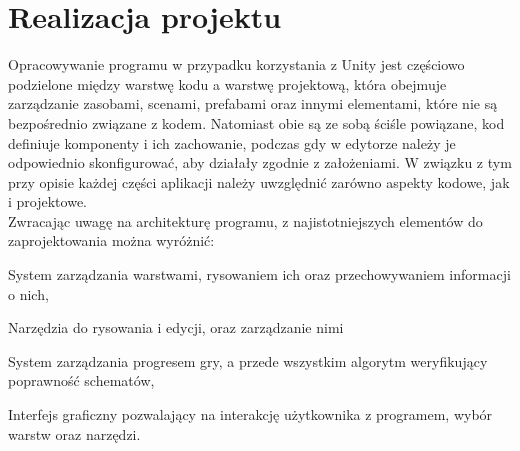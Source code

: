 \chapter{Realizacja projektu}
\label{ch:realizacja_projektu}

Opracowywanie programu w przypadku korzystania z Unity jest częściowo podzielone między warstwę kodu a warstwę projektową,
która obejmuje zarządzanie zasobami, scenami, prefabami oraz innymi elementami, które nie są bezpośrednio związane z kodem.
Natomiast obie są ze sobą ściśle powiązane, kod definiuje komponenty i ich zachowanie,
podczas gdy w edytorze należy je odpowiednio skonfigurować, aby działały zgodnie z założeniami.
W związku z tym przy opisie każdej części aplikacji należy uwzględnić zarówno aspekty kodowe, jak i projektowe.\\
\indent Zwracając uwagę na architekturę programu, z najistotniejszych elementów do zaprojektowania można wyróżnić:

\begin{citemize}
    \item System zarządzania warstwami, rysowaniem ich oraz przechowywaniem informacji o nich,
    \item Narzędzia do rysowania i edycji, oraz zarządzanie nimi
    \item System zarządzania progresem gry, a przede wszystkim algorytm weryfikujący poprawność schematów,
    \item Interfejs graficzny pozwalający na interakcję użytkownika z programem, wybór warstw oraz narzędzi.
\end{citemize}




